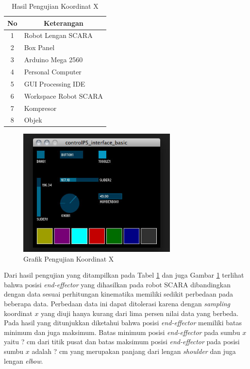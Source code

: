  \begin{table}[H]
 	\centering
 	\caption{Hasil Pengujian Koordinat X}
 	\label{tbl.koordinatx}
 	\begin{tabular}{|c|l|}
 		\hline
 		\rowcolor[HTML]{9B9B9B} 
 		
 		No & \multicolumn{1}{c|}{\cellcolor[HTML]{9B9B9B}Keterangan} \\ \hline
 		1  & Robot Lengan SCARA                                      \\ \hline
 		2  & Box Panel                                               \\ \hline
 		3  & Arduino Mega 2560                                       \\ \hline
 		4  & Personal Computer                                       \\ \hline
 		5  & GUI Processing IDE                                      \\ \hline
 		6  & Workspace Robot SCARA                                   \\ \hline
 		7  & Kompresor                                               \\ \hline
 		8  & Objek                                                   \\ \hline
 	\end{tabular}
 	
 \end{table} 
	\begin{figure}[H]
	\centering
	\includegraphics[width=8cm]{gambar/controlp5.jpg}
	\caption{Grafik Pengujian Koordinat X}
	\label{pic.koordinatx}
\end{figure}

Dari hasil pengujian yang ditampilkan pada Tabel \ref{tbl.koordinatx} dan juga Gambar \ref{pic.koordinatx} terlihat bahwa posisi \textit{end-effector} yang dihasilkan pada robot SCARA dibandingkan dengan data sesuai perhitungan kinematika memiliki sedikit perbedaan pada beberapa data. Perbedaan data ini dapat ditolerasi karena dengan \textit{sampling} koordinat $x$ yang diuji hanya kurang dari lima persen nilai data yang berbeda. Pada hasil yang ditunjukkan diketahui bahwa posisi \textit{end-effector} memiliki batas minimum dan juga maksimum. Batas minimum posisi \textit{end-effector} pada sumbu $x$ yaitu ? cm dari titik pusat dan batas maksimum posisi \textit{end-effector} pada posisi sumbu $x$ adalah ? cm yang merupakan panjang dari lengan \textit{shoulder} dan juga lengan \textit{elbow}. 

